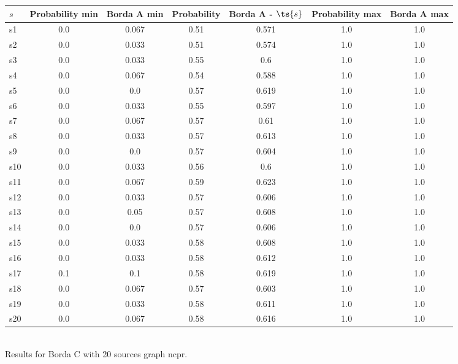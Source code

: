 \documentclass{article}
\begin{document}
\noindent\begin{tabular}{|l|c|c|c|c|c|c|}
\hline
$s$& Probability min & Borda A min & Probability & Borda A - $\ts{s}$ & Probability max & Borda A max\\
\hline
s1 &0.0 & 0.067 & 0.51 & 0.571 & 1.0 & 1.0\\
\hline
s2 &0.0 & 0.033 & 0.51 & 0.574 & 1.0 & 1.0\\
\hline
s3 &0.0 & 0.033 & 0.55 & 0.6 & 1.0 & 1.0\\
\hline
s4 &0.0 & 0.067 & 0.54 & 0.588 & 1.0 & 1.0\\
\hline
s5 &0.0 & 0.0 & 0.57 & 0.619 & 1.0 & 1.0\\
\hline
s6 &0.0 & 0.033 & 0.55 & 0.597 & 1.0 & 1.0\\
\hline
s7 &0.0 & 0.067 & 0.57 & 0.61 & 1.0 & 1.0\\
\hline
s8 &0.0 & 0.033 & 0.57 & 0.613 & 1.0 & 1.0\\
\hline
s9 &0.0 & 0.0 & 0.57 & 0.604 & 1.0 & 1.0\\
\hline
s10 &0.0 & 0.033 & 0.56 & 0.6 & 1.0 & 1.0\\
\hline
s11 &0.0 & 0.067 & 0.59 & 0.623 & 1.0 & 1.0\\
\hline
s12 &0.0 & 0.033 & 0.57 & 0.606 & 1.0 & 1.0\\
\hline
s13 &0.0 & 0.05 & 0.57 & 0.608 & 1.0 & 1.0\\
\hline
s14 &0.0 & 0.0 & 0.57 & 0.606 & 1.0 & 1.0\\
\hline
s15 &0.0 & 0.033 & 0.58 & 0.608 & 1.0 & 1.0\\
\hline
s16 &0.0 & 0.033 & 0.58 & 0.612 & 1.0 & 1.0\\
\hline
s17 &0.1 & 0.1 & 0.58 & 0.619 & 1.0 & 1.0\\
\hline
s18 &0.0 & 0.067 & 0.57 & 0.603 & 1.0 & 1.0\\
\hline
s19 &0.0 & 0.033 & 0.58 & 0.611 & 1.0 & 1.0\\
\hline
s20 &0.0 & 0.067 & 0.58 & 0.616 & 1.0 & 1.0\\
\hline
\end{tabular}\\

\noindent Results for Borda C with 20 sources graph ncpr.
\end{document}
